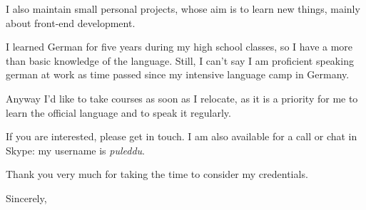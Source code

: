 \documentclass[11pt]{letter} %
\begin{document}
\begin{letter}{}
I also maintain small personal projects, whose aim is to learn new things, mainly about front-end development.

I learned German for five years during my high school classes, so I have a more than basic knowledge of the language. Still, I can't say I am proficient speaking german at work as time passed since my intensive language camp in Germany.

Anyway I'd like to take courses as soon as I relocate, as it is a priority for me to learn the official language and to speak it regularly.

If you are interested, please get in touch. I am also available
for a call or chat in Skype: my username is \emph{puleddu}.

Thank you very much for taking the time to consider my credentials.

\closing{Sincerely,}
\end{letter}
\end{document}
